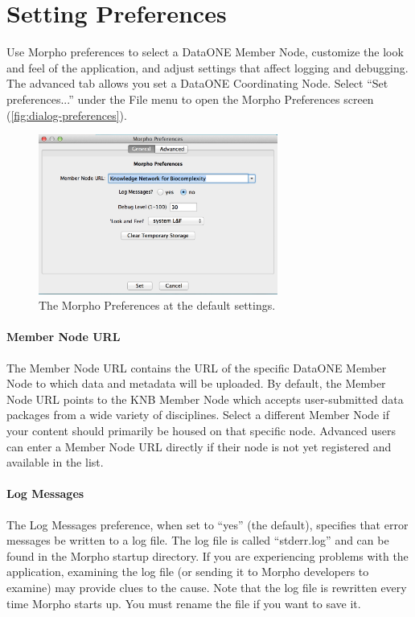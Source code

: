 \section{Setting Preferences} \label{sec:preferences}

Use Morpho preferences to select a DataONE
Member Node, customize the look and feel
of the application, and adjust settings that affect logging and
debugging. The advanced tab allows you set a DataONE Coordinating Node. 
Select ``Set preferences...'' under the File menu to open the
Morpho Preferences screen (\autoref{fig:dialog-preferences}).

\begin{figure}
  \centering
    \includegraphics[width=0.7\textwidth]{images/dialog-preferences.png}
  \caption{The Morpho Preferences at the default settings.}
  \label{fig:dialog-preferences}
\end{figure}

\paragraph{Member Node URL} The Member Node URL contains the URL of the specific
DataONE Member Node to which data and metadata will be uploaded. By default, the 
Member Node URL points to the KNB Member Node which accepts user-submitted 
data packages from a wide variety of disciplines. Select a different Member Node 
if your content should primarily be housed on that specific node.
Advanced users can enter a Member Node URL directly if their node is not yet 
registered and available in the list.

\paragraph{Log Messages} The Log Messages preference, when set to ``yes'' (the
default), specifies that error messages be written to a log file. The
log file is called ``stderr.log'' and can be found in the Morpho startup
directory. If you are experiencing problems with the application,
examining the log file (or sending it to Morpho developers to examine)
may provide clues to the cause. Note that the log file is rewritten
every time Morpho starts up. You must rename the file if you want to
save it.

